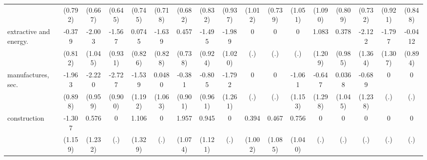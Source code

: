 {\begin{tabular}{l*{16}{c}}
                    &     (0.792)         &     (0.667)         &     (0.645)         &     (0.745)         &     (0.718)         &     (0.682)         &     (0.832)         &     (0.937)         &     (1.012)         &     (0.739)         &     (1.051)         &     (1.090)         &     (0.809)         &     (0.732)         &     (0.921)         &     (0.848)         \\
[1em]
extractive and energy.&      -0.379         &      -2.003         &      -1.567         &      0.0745         &      -1.639\sym{*}  &       0.457         &      -1.495         &      -1.989         &           0         &           0         &           0         &       1.083         &       0.378         &      -2.122         &      -1.797         &     -0.0412         \\
                    &     (0.812)         &     (1.045)         &     (0.931)         &     (0.826)         &     (0.828)         &     (0.738)         &     (0.924)         &     (1.020)         &         (.)         &         (.)         &         (.)         &     (1.209)         &     (0.985)         &     (1.364)         &     (1.307)         &     (0.894)         \\
[1em]
manufactures, sec.  &      -1.963\sym{*}  &      -2.220\sym{*}  &      -2.727\sym{**} &      -1.539         &      0.0480         &      -0.381         &      -0.805         &      -1.792         &           0         &           0         &      -1.061         &      -0.647         &      0.0368         &      -0.689         &           0         &           0         \\
                    &     (0.898)         &     (0.959)         &     (0.900)         &     (1.192)         &     (1.063)         &     (0.901)         &     (0.961)         &     (1.261)         &         (.)         &         (.)         &     (1.153)         &     (1.298)         &     (1.045)         &     (1.238)         &         (.)         &         (.)         \\
[1em]
construction        &      -1.307         &       0.576         &           0         &       1.106         &           0         &       1.957         &       0.945         &           0         &       0.394         &       0.467         &       0.756         &           0         &           0         &           0         &           0         &           0         \\
                    &     (1.159)         &     (1.232)         &         (.)         &     (1.329)         &         (.)         &     (1.074)         &     (1.121)         &         (.)         &     (1.002)         &     (1.085)         &     (1.040)         &         (.)         &         (.)         &         (.)         &         (.)         &         (.)         \\

\end{tabular}}

